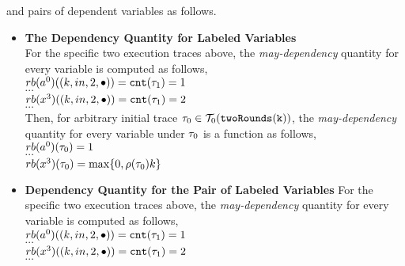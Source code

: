 \begin{example}
    and pairs of dependent variables as follows.
\begin{itemize}
    \item \textbf{The Dependency Quantity for Labeled Variables}
    \\
    For the specific two execution traces above,
    the \emph{may-dependency} quantity for every variable
    is computed as follows,
   \\
   $rb(a^0) ((k, in, 2, \bullet))  = \mathtt{cnt}(\mathtt{\tau}_1) = 1$
   \\
   $\cdots$
  \\
   $rb(x^3) ((k, in, 2, \bullet))  = \mathtt{cnt}(\mathtt{\tau}_1) = 2$
    \\
    $\cdots$
    \\

    Then, for arbitrary initial trace $\mathtt{\tau}_0 \in \mathcal{T}_0(\mathtt{twoRounds(k)})$,
    the \emph{may-dependency} quantity for every variable under $\mathtt{\tau}_0$ is a function
    as follows,
    \\
    $rb(a^0) (\mathtt{\tau}_0)  = 1$
    \\
    $\cdots$
    \\
    $rb(x^3) (\mathtt{\tau}_0)  = \max\{0, \rho(\mathtt{\tau}_0) k \} $
    \item \textbf{Dependency Quantity for the Pair of Labeled Variables}
    For the specific two execution traces above,
    the \emph{may-dependency} quantity for every variable
    is computed as follows,
   \\
   $rb(a^0) ((k, in, 2, \bullet))  = \mathtt{cnt}(\mathtt{\tau}_1) = 1$
   \\
   $\cdots$
  \\
   $rb(x^3) ((k, in, 2, \bullet))  = \mathtt{cnt}(\mathtt{\tau}_1) = 2$
    \\
    $\cdots$
    \\


\end{itemize}
\end{example}
